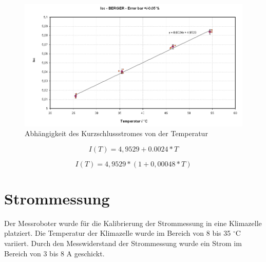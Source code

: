 \documentclass[a4paper,bibtotoc,oneside]{scrbook}
\begin{document}
\begin{figure}[htbp]
\centering
\includegraphics[width=150mm]{img/tempkoef.png}
\caption{Abhängigkeit des Kurzschlussstromes von der Temperatur}\label{tempkoef}
\end{figure}

  \begin{equation}
     I(T) = 4,9529+0.0024 \ast T
  \end{equation}
  
    \begin{equation}
     I(T) = 4,9529 \ast ( 1 + 0,00048 \ast T)
  \end{equation}

\section{Strommessung}\thispagestyle{empty}

Der Messroboter wurde für die Kalibrierung der Strommessung in eine Klimazelle platziert.  Die Temperatur der Klimazelle wurde im Bereich von 8 bis 35 $^{\circ}$C variiert. Durch den Messwiderstand der Strommessung wurde ein Strom im Bereich von 3 bis 8 A geschickt.  
\end{document}
